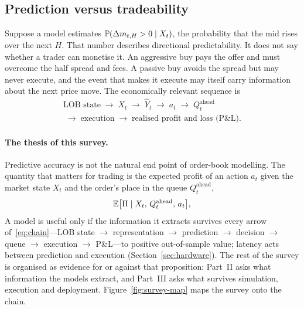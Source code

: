 \subsection{Prediction versus tradeability}
\label{sec:tradeability}

Suppose a model estimates $\P(\Delta m_{t,H} > 0 \mid X_t)$, the probability that the mid rises over
the next $H$. That
number describes directional predictability. It does not say whether a trader can monetise it. An
aggressive buy pays the offer and must overcome the half spread and fees. A passive buy avoids the
spread but may never execute, and the event that makes it execute may itself carry information
about the next price move. The economically relevant sequence is
\begin{equation}
  \begin{gathered}
  \text{LOB state} \;\to\; X_t \;\to\; \widehat{Y}_t \;\to\; a_t \;\to\; Q^{\text{ahead}}_t\\
  \;\to\; \text{execution} \;\to\; \text{realised profit and loss (P\&L)}.
  \end{gathered}
  \label{eq:chain}
\end{equation}

\paragraph{The thesis of this survey.} Predictive accuracy is not the natural end point of order-book modelling. The
quantity that matters for trading is the expected profit of an action $a_t$ given the market state $X_t$ and the
order's place in the queue $Q^{\text{ahead}}_t$,
\begin{equation}
  \E\big[\Pi \mid X_t,\, Q^{\text{ahead}}_t,\, a_t\big],
  \label{eq:thesis}
\end{equation}
A model is useful only if the information it extracts survives every arrow of~\eqref{eq:chain}---LOB state $\to$
representation $\to$ prediction $\to$ decision $\to$ queue $\to$ execution $\to$ P\&L---to positive out-of-sample
value; latency acts between prediction and execution (Section~\ref{sec:hardware}). The rest of the survey
is organised as evidence for or against that proposition: Part~II asks what information the models extract, and
Part~III asks what survives simulation, execution and deployment. Figure~\ref{fig:survey-map} maps the survey onto the chain.

